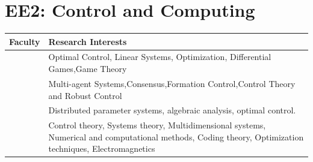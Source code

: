 \documentclass[openany]{book} %
\begin{document}
\section{EE2: Control and Computing}
\begin{tabular}{p{4.5cm} p{9cm}}

\hline 
\hline 
Faculty & Research Interests \\ 
\hline
\hline 

\href{https://www.ee.iitb.ac.in/wiki/faculty/dc}{\color{blue}{Prof. Debraj Chakraborty }} & Optimal Control, Linear Systems, Optimization, Differential Games,Game Theory \\ 
\hline 

\href{https://scholar.google.co.in/citations?user=9lWahYMAAAAJ&hl=en}{\color{blue}{Prof. Dwaipayan Mukherjee }} & Multi-agent Systems,Consensus,Formation Control,Control Theory and Robust Control \\ 
\hline 

\href{https://www.ee.iitb.ac.in/~debasattam/}{\color{blue}{Prof. Debasattam Pal}} & Distributed parameter systems, algebraic analysis, optimal control. \\ 
\hline 


\href{https://www.ee.iitb.ac.in/wiki/faculty/hp}{\color{blue}{Prof. Harish K. Pillai }} & Control theory, Systems theory, Multidimensional systems, Numerical
and computational methods, Coding theory, Optimization techniques, Electromagnetics \\ 
\hline
 

\end{tabular}
\end{document}
